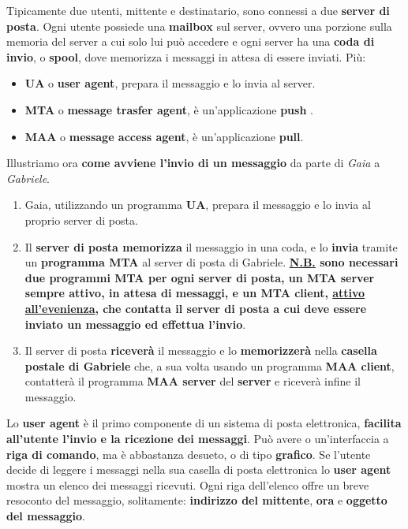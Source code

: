 \documentclass[11pt,a4paper]{article}
\theoremstyle{definition}
\begin{document}
Tipicamente due utenti, mittente e destinatario, sono connessi a due \textbf{server di posta}. Ogni utente possiede una \textbf{mailbox} sul server, ovvero una porzione sulla memoria del server a cui solo lui può accedere e ogni server ha una \textbf{coda di invio}, o \textbf{spool}, dove memorizza i messaggi in attesa di essere inviati. Più:
\begin{itemize}
	\item \textbf{UA} o  \textbf{user agent}, prepara il messaggio e lo invia al server.
	\item \textbf{MTA} o \textbf{message trasfer agent}, è un'applicazione \textbf{push} .
	\item \textbf{MAA} o \textbf{message access agent}, è un'applicazione \textbf{pull}.
\end{itemize}
\newpage
Illustriamo ora \textbf{come avviene l'invio di un messaggio} da parte di \textit{Gaia} a \textit{Gabriele}.
\begin{enumerate}
	\item Gaia, utilizzando un programma \textbf{UA}, prepara il messaggio e lo invia al proprio server di posta.
	\item Il \textbf{server di posta memorizza} il messaggio in una coda, e lo \textbf{invia} tramite un \textbf{programma MTA} al server di posta di Gabriele.\textbf{ \underline{N.B.} sono necessari due programmi MTA per ogni server di posta, un MTA server sempre attivo, in attesa di messaggi, e un MTA client, \underline{attivo all'evenienza}, che contatta il server di posta a cui deve essere inviato un messaggio  ed effettua l'invio}.
	\item Il server di posta \textbf{riceverà} il messaggio e lo \textbf{memorizzerà} nella \textbf{casella postale di Gabriele} che, a sua volta usando un programma \textbf{MAA client}, contatterà il programma \textbf{MAA server} del \textbf{server} e riceverà infine il messaggio.
\end{enumerate}
Lo \textbf{user agent} è il primo componente di un sistema di posta elettronica, \textbf{facilita all'utente l'invio e la ricezione dei messaggi}. Può avere o un'interfaccia a \textbf{riga di comando}, ma è abbastanza desueto, o di tipo \textbf{grafico}. Se l'utente decide di leggere i messaggi nella sua casella di posta elettronica lo \textbf{user agent} mostra un elenco dei messaggi ricevuti. Ogni riga dell'elenco offre un breve resoconto del messaggio, solitamente: \textbf{indirizzo del mittente}, \textbf{ora} e \textbf{oggetto del messaggio}.\newline\newline
\end{document}
